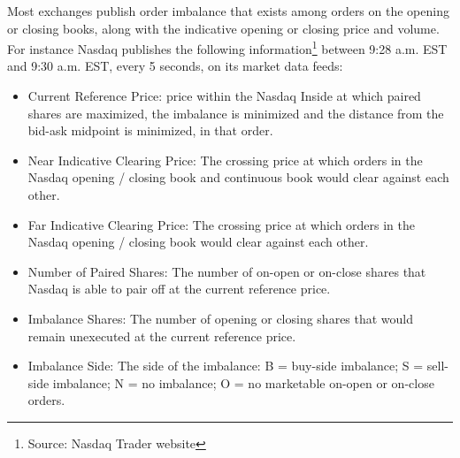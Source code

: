 Most exchanges publish order imbalance that exists among orders on the opening or closing books, along with the indicative opening or closing price and volume. For instance Nasdaq publishes the following information\footnote{Source: Nasdaq Trader website} between 9:28 a.m. EST and 9:30 a.m. EST,  every 5 seconds, on its market data feeds:
\begin{itemize}
\item  Current Reference Price: price within the Nasdaq Inside at which paired shares are maximized, the imbalance is minimized and the distance from the bid-ask midpoint is minimized, in that order.
\item  Near Indicative Clearing Price: The crossing price at which orders in the Nasdaq opening / closing book and continuous book would clear against each other. 
\item  Far Indicative Clearing Price: The crossing price at which orders in the Nasdaq opening / closing book would clear against each other. 
\item  Number of Paired Shares: The number of on-open or on-close shares that Nasdaq is able to pair off at the current reference price. 
\item  Imbalance Shares: The number of opening or closing shares that would remain unexecuted at the current reference price. 
\item  Imbalance Side: The side of the imbalance: B = buy-side imbalance; S = sell-side imbalance; N = no imbalance; O = no marketable on-open or on-close orders.
\end{itemize}



